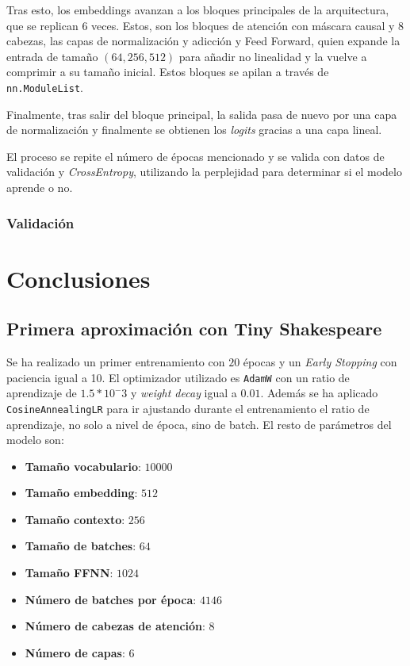 \documentclass[11pt]{book}
\newcommand{\clearemptydoublepage}{\newpage{\pagestyle{empty}\cleardoublepage}}
\theoremstyle{plain}
\theoremstyle{definition}
\begin{document}
Tras esto, los embeddings avanzan a los bloques principales de la arquitectura, que se replican $6$ veces. Estos, son los bloques de atención con máscara causal y 8 cabezas, las capas de normalización y adicción y Feed Forward, quien expande la entrada de tamaño $(64,256, 512)$ para añadir no linealidad y la vuelve a comprimir a su tamaño inicial. Estos bloques se apilan a través de \texttt{nn.ModuleList}. 

Finalmente, tras salir del bloque principal, la salida pasa de nuevo por una capa de normalización y finalmente se obtienen los \textit{logits} gracias a una capa lineal. 

El proceso se repite el número de épocas mencionado y se valida con datos de validación y \textit{CrossEntropy}, utilizando la perplejidad para determinar si el modelo aprende o no.


\subsection{Validación} \label{subsec:validacion}






\clearemptydoublepage

\chapter{Conclusiones}

\section{Primera aproximación con Tiny Shakespeare}

Se ha realizado un primer entrenamiento con $20$ épocas y un \textit{Early Stopping} con paciencia igual a 10. El optimizador utilizado es \texttt{AdamW} con un ratio de aprendizaje de $1.5*10^-3$ y \textit{weight decay} igual a $0.01$. Además se ha aplicado \texttt{CosineAnnealingLR} para ir ajustando durante el entrenamiento el ratio de aprendizaje, no solo a nivel de época, sino de batch. El resto de parámetros del modelo son: 

\begin{itemize}
    \item \textbf{Tamaño vocabulario}: $10000$
    \item \textbf{Tamaño embedding}: $512$
    \item \textbf{Tamaño contexto}: $256$
    \item \textbf{Tamaño de batches}: $64$
    \item \textbf{Tamaño FFNN}: $1024$
    \item \textbf{Número de batches por época}: $4146$
    \item \textbf{Número de cabezas de atención}: $8$
    \item \textbf{Número de capas}: $6$
\end{itemize}
\end{document}
